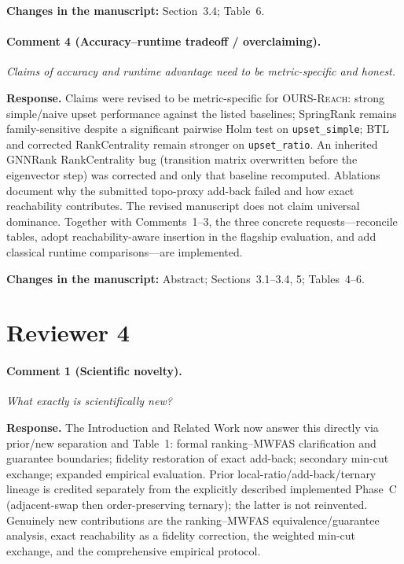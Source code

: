 \documentclass[11pt]{article}
\newcommand{\commentbox}[1]{\par\textit{#1}\par\medskip}
\newcommand{\changes}[1]{\textbf{Changes in the manuscript:} #1\par\medskip}
\begin{document}
\changes{Section~3.4; Table~6.}

\paragraph{Comment 4 (Accuracy--runtime tradeoff / overclaiming).}
\commentbox{Claims of accuracy and runtime advantage need to be metric-specific and honest.}

\noindent\textbf{Response.}
Claims were revised to be metric-specific for \textsc{OURS-Reach}: strong simple/naive upset performance against the listed baselines; SpringRank remains family-sensitive despite a significant pairwise Holm test on \texttt{upset\_simple}; BTL and corrected RankCentrality remain stronger on \texttt{upset\_ratio}. An inherited GNNRank RankCentrality bug (transition matrix overwritten before the eigenvector step) was corrected and only that baseline recomputed. Ablations document why the submitted topo-proxy add-back failed and how exact reachability contributes. The revised manuscript does not claim universal dominance. Together with Comments~1--3, the three concrete requests---reconcile tables, adopt reachability-aware insertion in the flagship evaluation, and add classical runtime comparisons---are implemented.

\changes{Abstract; Sections~3.1--3.4, 5; Tables~4--6.}

\section*{Reviewer 4}

\paragraph{Comment 1 (Scientific novelty).}
\commentbox{What exactly is scientifically new?}

\noindent\textbf{Response.}
The Introduction and Related Work now answer this directly via prior/new separation and Table~1: formal ranking--MWFAS clarification and guarantee boundaries; fidelity restoration of exact add-back; secondary min-cut exchange; expanded empirical evaluation. Prior local-ratio/add-back/ternary lineage is credited separately from the explicitly described implemented Phase~C (adjacent-swap then order-preserving ternary); the latter is not reinvented. Genuinely new contributions are the ranking--MWFAS equivalence/guarantee analysis, exact reachability as a fidelity correction, the weighted min-cut exchange, and the comprehensive empirical protocol.
\end{document}
